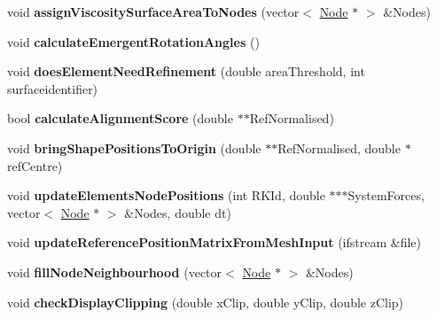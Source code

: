 \begin{DoxyCompactItemize}
\item 
\hypertarget{classShapeBase_a3ed8350b9a657a9f6543520b0a9e5a67}{}void {\bfseries assign\+Viscosity\+Surface\+Area\+To\+Nodes} (vector$<$ \hyperlink{classNode}{Node} $\ast$ $>$ \&Nodes)\label{classShapeBase_a3ed8350b9a657a9f6543520b0a9e5a67}

\item 
\hypertarget{classShapeBase_af616bee3616ec9d1f99628745f330ad7}{}void {\bfseries calculate\+Emergent\+Rotation\+Angles} ()\label{classShapeBase_af616bee3616ec9d1f99628745f330ad7}

\item 
\hypertarget{classShapeBase_ac776b9eb4079c175721ca1363bcde77c}{}void {\bfseries does\+Element\+Need\+Refinement} (double area\+Threshold, int surfaceidentifier)\label{classShapeBase_ac776b9eb4079c175721ca1363bcde77c}

\item 
\hypertarget{classShapeBase_a1578faef4bfc3c8de9f8f94fd9e6b52d}{}bool {\bfseries calculate\+Alignment\+Score} (double $\ast$$\ast$Ref\+Normalised)\label{classShapeBase_a1578faef4bfc3c8de9f8f94fd9e6b52d}

\item 
\hypertarget{classShapeBase_aa07ce2dcc297aa5aea5a37516dcea069}{}void {\bfseries bring\+Shape\+Positions\+To\+Origin} (double $\ast$$\ast$Ref\+Normalised, double $\ast$ref\+Centre)\label{classShapeBase_aa07ce2dcc297aa5aea5a37516dcea069}

\item 
\hypertarget{classShapeBase_af4df88dad7ec1c487736216e15b5c67a}{}void {\bfseries update\+Elements\+Node\+Positions} (int R\+K\+Id, double $\ast$$\ast$$\ast$System\+Forces, vector$<$ \hyperlink{classNode}{Node} $\ast$ $>$ \&Nodes, double dt)\label{classShapeBase_af4df88dad7ec1c487736216e15b5c67a}

\item 
\hypertarget{classShapeBase_a29d28195e334308f1b3afba113ef1212}{}void {\bfseries update\+Reference\+Position\+Matrix\+From\+Mesh\+Input} (ifstream \&file)\label{classShapeBase_a29d28195e334308f1b3afba113ef1212}

\item 
\hypertarget{classShapeBase_afe299910c51313a27526c585df128047}{}void {\bfseries fill\+Node\+Neighbourhood} (vector$<$ \hyperlink{classNode}{Node} $\ast$ $>$ \&Nodes)\label{classShapeBase_afe299910c51313a27526c585df128047}

\item 
\hypertarget{classShapeBase_a3a3490f8a96e14e59b82f4de24ce48e2}{}void {\bfseries check\+Display\+Clipping} (double x\+Clip, double y\+Clip, double z\+Clip)\label{classShapeBase_a3a3490f8a96e14e59b82f4de24ce48e2}


\end{DoxyCompactItemize}
